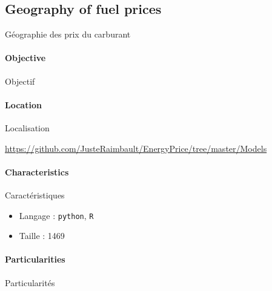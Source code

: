 

\subsection{Geography of fuel prices}{Géographie des prix du carburant}

\paragraph{Objective}{Objectif}


\paragraph{Location}{Localisation}

\url{https://github.com/JusteRaimbault/EnergyPrice/tree/master/Models}

\paragraph{Characteristics}{Caractéristiques}

\begin{itemize}
\item Langage : \texttt{python}, \texttt{R}
\item Taille : 1469
\end{itemize}


\paragraph{Particularities}{Particularités}















\stars





